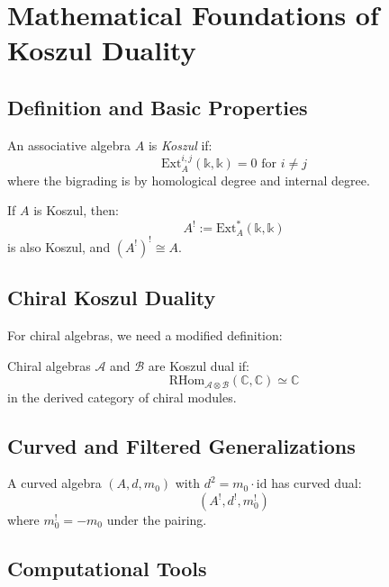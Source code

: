 \appendix
\section{Mathematical Foundations of Koszul Duality}

\subsection{Definition and Basic Properties}

\begin{definition}
An associative algebra $A$ is \emph{Koszul} if:
$$\text{Ext}_A^{i,j}(\mathbb{k}, \mathbb{k}) = 0 \text{ for } i \neq j$$
where the bigrading is by homological degree and internal degree.
\end{definition}

\begin{theorem}
If $A$ is Koszul, then:
$$A^! := \text{Ext}_A^*(\mathbb{k}, \mathbb{k})$$
is also Koszul, and $(A^!)^! \cong A$.
\end{theorem}

\subsection{Chiral Koszul Duality}

For chiral algebras, we need a modified definition:

\begin{definition}
Chiral algebras $\mathcal{A}$ and $\mathcal{B}$ are Koszul dual if:
$$\text{RHom}_{\mathcal{A} \otimes \mathcal{B}}(\mathbb{C}, \mathbb{C}) \simeq \mathbb{C}$$
in the derived category of chiral modules.
\end{definition}

\subsection{Curved and Filtered Generalizations}

\begin{definition}
A curved algebra $(A, d, m_0)$ with $d^2 = m_0 \cdot \text{id}$ has curved dual:
$$(A^!, d^!, m_0^!)$$
where $m_0^! = -m_0$ under the pairing.
\end{definition}

\subsection{Computational Tools}

